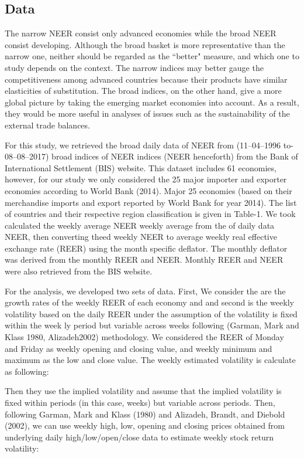 \documentclass[]{elsarticle} %
\begin{document}
\subsection{Data}\label{data}

The narrow NEER consist only advanced economies while the broad NEER
consist developing. Although the broad basket is more representative
than the narrow one, neither should be regarded as the ``better"
measure, and which one to study depends on the context. The narrow
indices may better gauge the competitiveness among advanced countries
because their products have similar elasticities of substitution. The
broad indices, on the other hand, give a more global picture by taking
the emerging market economies into account. As a result, they would be
more useful in analyses of issues such as the sustainability of the
external trade balances.

For this study, we retrieved the broad daily data of NEER from
(11--04--1996 to- 08--08--2017) broad indices of NEER indices (NEER
henceforth) from the Bank of International Settlement (BIS) website.
This dataset includes 61 economies, however, for our study we only
considered the 25 major importer and exporter economies according to
World Bank (2014). Major 25 economies (based on their merchandise
imports and export reported by World Bank for year 2014). The list of
countries and their respective region classification is given in
Table-1. We took calculated the weekly average NEER weekly average from
the of daily data NEER, then converting theed weekly NEER to average
weekly real effective exchange rate (REER) using the month specific
deflator. The monthly deflator was derived from the monthly REER and
NEER. Monthly REER and NEER were also retrieved from the BIS website.

For the analysis, we developed two sets of data. First, We consider the
are the growth rates of the weekly REER of each economy and and second
is the weekly volatility based on the daily REER under the assumption of
the volatility is fixed within the week ly period but variable across
weeks following (Garman, Mark and Klass 1980, Alizadeh2002) methodology.
We considered the REER of Monday and Friday as weekly opening and
closing value, and weekly minimum and maximum as the low and close
value. The weekly estimated volatility is calculate as following:

Then they use the implied volatility and assume that the implied
volatility is fixed within periods (in this case, weeks) but variable
across periods. Then, following Garman, Mark and Klass (1980) and
Alizadeh, Brandt, and Diebold (2002), we can use weekly high, low,
opening and closing prices obtained from underlying daily
high/low/open/close data to estimate weekly stock return volatility:
\end{document}
